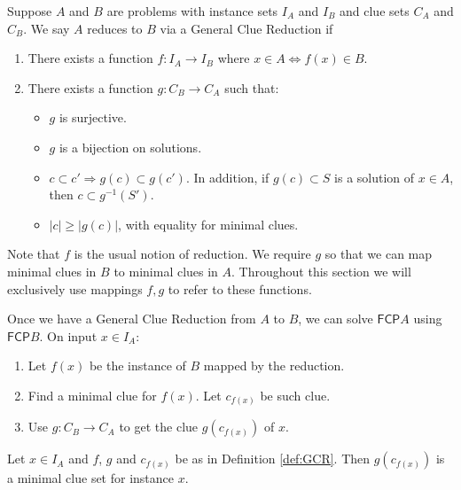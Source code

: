 \documentclass[runningheads,a4paper]{llncs}
\begin{document}
\begin{definition}\label{def:GCR}
Suppose $A$ and $B$ are problems with instance sets $I_A$ and $I_B$ and clue sets $C_A$ and $C_B$. We say $A$ reduces to $B$ via a General Clue Reduction if
\begin{enumerate}
\item There exists a function $f: I_A \rightarrow I_B$ where $x \in A \iff f(x) \in B$.
\item There exists a function $g: C_B \rightarrow C_A$ such that:
\begin{itemize}
\item $g$ is surjective. 
\item $g$ is a bijection on solutions.
\item $c \subset c' \Rightarrow g(c) \subset g(c')$. In addition, if $g(c) \subset S$ is a solution of $x \in A$, then $c \subset g^{-1}(S')$.
\item $|c| \geq |g(c)|$, with equality for minimal clues. 
\end{itemize}
\end{enumerate}
\end{definition}
Note that $f$ is the usual notion of reduction. We require $g$ so that we can map minimal clues in $B$ to minimal clues in $A$. Throughout this section we will exclusively use mappings $f, g$ to refer to these functions. 

Once we have a General Clue Reduction from $A$ to $B$, we can solve $\mathsf{FCP} A$ using $\mathsf{FCP} B$. On input $x \in I_A$:
\begin{enumerate}
\item Let $f(x)$ be the instance of $B$ mapped by the reduction.
\item Find a minimal clue for $f(x)$. Let $c_{f(x)}$ be such clue. 
\item Use $g: C_B \rightarrow C_A$ to get the clue $g(c_{f(x)})$ of $x$.
\end{enumerate}

\begin{lemma}\label{lemmaMinClue}
Let $x \in I_A$ and $f$, $g$ and $c_{f(x)}$ be as in Definition \ref{def:GCR}. Then $g(c_{f(x)})$ is a minimal clue set for instance $x$.
\end{lemma}
\end{document}
